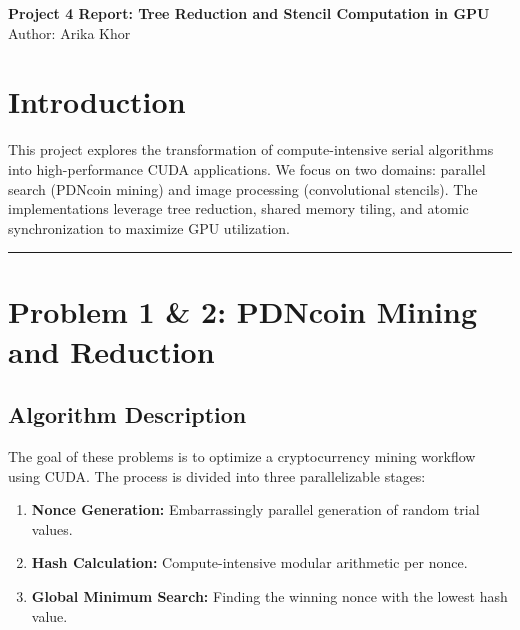 \documentclass[11pt]{article}
\begin{document}
\begin{center}
    {\Large \textbf{\color{white}Project 4 Report: Tree Reduction and Stencil Computation in GPU}}\\
    \vspace{0.5em}
    Author: Arika Khor
\end{center}

\vspace{1em}

\section*{\color{white}Introduction}
This project explores the transformation of compute-intensive serial algorithms into high-performance CUDA applications. We focus on two domains: parallel search (PDNcoin mining) and image processing (convolutional stencils). The implementations leverage tree reduction, shared memory tiling, and atomic synchronization to maximize GPU utilization.

\noindent\rule{\textwidth}{0.4pt}

\section*{\color{white}Problem 1 \& 2: PDNcoin Mining and Reduction}

\subsection*{Algorithm Description}
The goal of these problems is to optimize a cryptocurrency mining workflow using CUDA. The process is divided into three parallelizable stages:
\begin{enumerate}[label=\arabic*.]
    \item \textbf{Nonce Generation:} Embarrassingly parallel generation of random trial values.
    \item \textbf{Hash Calculation:} Compute-intensive modular arithmetic per nonce.
    \item \textbf{Global Minimum Search:} Finding the winning nonce with the lowest hash value.
\end{enumerate}
\end{document}
